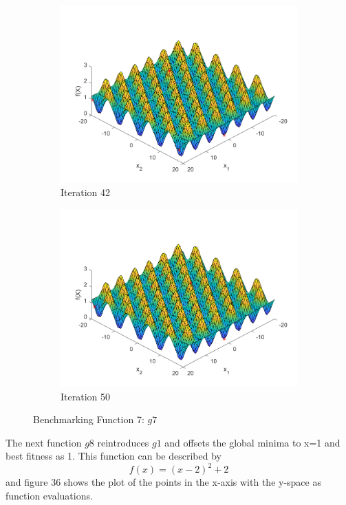 \begin{figure}
\begin{subfigure}[b]{0.4\textwidth}
   \includegraphics[width=\textwidth]{img/smpl/grwnk2d/loa-iter-42}
   \caption{Iteration 42}
   \label{fig:s3-iter-6}
 \end{subfigure}
 \begin{subfigure}[b]{0.4\textwidth}
   \includegraphics[width=\textwidth]{img/smpl/grwnk2d/loa-iter-50}
   \caption{Iteration 50}
   \label{fig:s3-iter-7}
 \end{subfigure}
 \caption{Benchmarking Function 7: $g7$}
\end{figure}

\par The next function $g8$ reintroduces $g1$ and offsets the global minima to x=1 and best fitness as 1. This function can be described by
$$
f(x) = (x-2)^2 + 2
$$
and figure 36 shows the plot of the points in the x-axis with the y-space as function evaluations.

